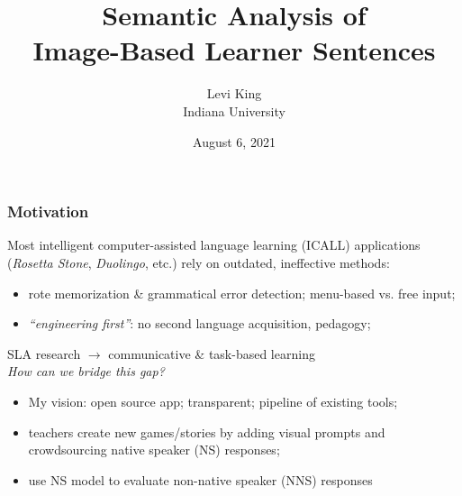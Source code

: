 \documentclass[xcolor={dvipsnames}]{beamer}
\title{Semantic Analysis of \\ Image-Based Learner Sentences}
\author[Levi King]{Levi King\\
Indiana University  }
\date{August 6, 2021}
\begin{document}
\maketitle
\begin{frame}
\frametitle{Motivation}
\pause
Most intelligent computer-assisted language learning (ICALL) applications (\textit{Rosetta Stone}, \textit{Duolingo}, etc.) rely on outdated, ineffective methods:
\begin{itemize}
\pause
\item rote memorization \& grammatical error detection; menu-based vs. free input;
\pause
\item \textit{``engineering first''}: no second language acquisition, pedagogy;
\end{itemize}
\pause
SLA research $\rightarrow$ communicative \& task-based learning \\

\pause
\vspace{1em}
\textit{How can we bridge this gap?}

\begin{itemize}
\pause
\item My vision: \pause open source app; transparent; pipeline of existing tools;
\pause
\item teachers create new games/stories by adding visual prompts and crowdsourcing native speaker (NS) responses;
\pause
\item use NS model to evaluate non-native speaker (NNS) responses
\end{itemize}
\end{frame}
\end{document}
